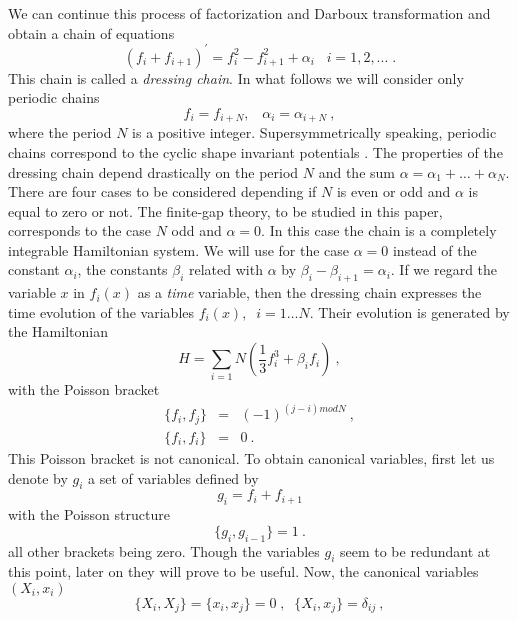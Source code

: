 \documentclass[a4paper,11pt]{article}
\begin{document}
We can continue this process of factorization and Darboux transformation and
obtain a chain of equations
\begin{equation}
\label{chain}
(f_i+f_{i+1})^{'}=f_i^2-f_{i+1}^2+\alpha_i\;\;\;i=1,2,...\;.
\end{equation}
This chain is called a {\it dressing chain}. In what follows we will
consider only periodic chains
\begin{equation}
\label{per}
f_i=f_{i+N},\;\;\;\alpha_i=\alpha _{i+N} ~,
\end{equation}
where the period $N$ is a positive integer. Supersymmetrically speaking,
periodic chains correspond to the cyclic shape invariant potentials
\cite{Sukhatme}. The properties of the dressing chain depend drastically on
the period $N$ and the sum $\alpha=\alpha_1+ \dots +\alpha_N.$ There are
four cases to be considered depending if $N$ is even or odd and $\alpha $ is
equal to zero or not. The finite-gap theory, to be studied in this paper,
corresponds to the case $N$ odd and $\alpha=0.$ In this case the chain is a
completely integrable Hamiltonian system. We will use for the case
$\alpha = 0$ instead of the constant $\alpha_i$, the constants $\beta_i$
related with $\alpha$ by $\beta_i - \beta_{i+1} = \alpha_i$.
 If we regard the variable $x$ in
$f_i(x)$ as a {\it time} variable, then the dressing chain expresses the
time evolution of the variables $f_i(x),\;\;i=1 \dots N$. Their evolution is
generated by the Hamiltonian
\begin{equation}
\label{H_evol}
H=\sum_{i=1}{N}\left(\frac{1}{3}f_i^3+\beta_if_i\right) ~,
\end{equation}
with the Poisson bracket
\begin{eqnarray}
\label{Poisson_f}
\{f_i,f_j\}&=&(-1)^{(j-i)mod N} ~,\\
\{f_i,f_i\}&=&0~.
\end{eqnarray}
This Poisson bracket is not canonical. To obtain canonical variables, first
let us denote by $g_i$ a set of variables defined by
\begin{equation}
\label{g}
g_i=f_i+f_{i+1}
\end{equation}
with the Poisson structure
\begin{equation}
\label{Poisson_g}
\{g_i,g_{i-1}\}=1 ~.
\end{equation}
all other brackets being zero.
Though the variables $g_i$ seem to be redundant at this point, later on they
will prove to be useful. Now, the canonical variables $(X_i,x_i)$
\begin{equation}
\label{Pisson_x}
\{X_i,X_j\}=\{x_i,x_j\}=0\;,\;\; \{X_i,x_j\}=\delta_{ij} ~,
\end{equation}
\end{document}
